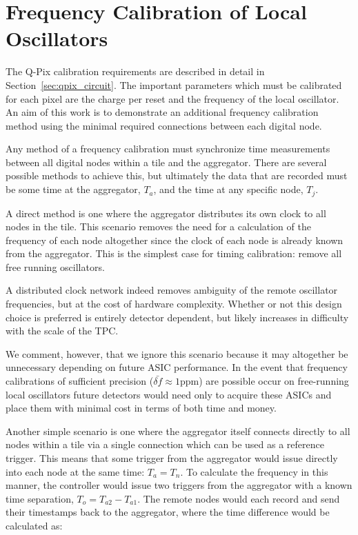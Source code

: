 \section{Frequency Calibration of Local Oscillators}\label{sec:calib}
The Q-Pix calibration requirements are described in detail in Section~\ref{sec:qpix_circuit}.
The important parameters which must be calibrated for each pixel are the charge per reset and the frequency of the local oscillator.
An aim of this work is to demonstrate an additional frequency calibration method using the minimal required connections between each digital node.

Any method of a frequency calibration must synchronize time measurements between all digital nodes within a tile and the aggregator.
There are several possible methods to achieve this, but ultimately the data that are recorded must be some time at the aggregator, $T_{a}$, and the time at any specific node, $T_{j}$.

A direct method is one where the aggregator distributes its own clock to all nodes in the tile.
This scenario removes the need for a calculation of the frequency of each node altogether since the clock of each node is already known from the aggregator.
This is the simplest case for timing calibration: remove all free running oscillators.

A distributed clock network indeed removes ambiguity of the remote oscillator frequencies, but at the cost of hardware complexity.
Whether or not this design choice is preferred is entirely detector dependent, but likely increases in difficulty with the scale of the TPC.

We comment, however, that we ignore this scenario because it may altogether be unnecessary depending on future ASIC performance.
In the event that frequency calibrations of sufficient precision ($\bar{\delta f} \approx 1 \mathrm{ppm}$) are possible occur on free-running local oscillators future detectors would need only to acquire these ASICs and place them with minimal cost in terms of both time and money.

Another simple scenario is one where the aggregator itself connects directly to all nodes within a tile via a single connection which can be used as a reference trigger.
This means that some trigger from the aggregator would issue directly into each node at the same time: $T_{a} = T_{n}$.
To calculate the frequency in this manner, the controller would issue two triggers from the aggregator with a known time separation, $T_{o} = T_{a2} - T_{a1}$.
The remote nodes would each record and send their timestamps back to the aggregator, where the time difference would be calculated as:

